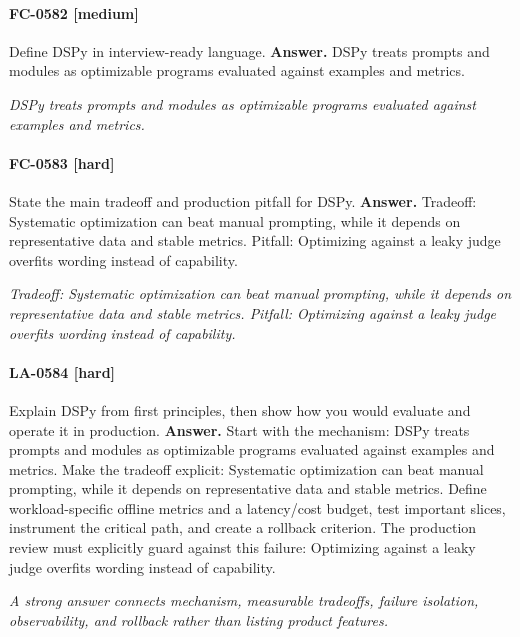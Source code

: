 \paragraph{FC-0582 [medium]} Define DSPy in interview-ready language.
\noindent\textbf{Answer.} DSPy treats prompts and modules as optimizable programs evaluated against examples and metrics.
\par\textit{DSPy treats prompts and modules as optimizable programs evaluated against examples and metrics.}
\paragraph{FC-0583 [hard]} State the main tradeoff and production pitfall for DSPy.
\noindent\textbf{Answer.} Tradeoff: Systematic optimization can beat manual prompting, while it depends on representative data and stable metrics. Pitfall: Optimizing against a leaky judge overfits wording instead of capability.
\par\textit{Tradeoff: Systematic optimization can beat manual prompting, while it depends on representative data and stable metrics. Pitfall: Optimizing against a leaky judge overfits wording instead of capability.}
\paragraph{LA-0584 [hard]} Explain DSPy from first principles, then show how you would evaluate and operate it in production.
\noindent\textbf{Answer.} Start with the mechanism: DSPy treats prompts and modules as optimizable programs evaluated against examples and metrics. Make the tradeoff explicit: Systematic optimization can beat manual prompting, while it depends on representative data and stable metrics. Define workload-specific offline metrics and a latency/cost budget, test important slices, instrument the critical path, and create a rollback criterion. The production review must explicitly guard against this failure: Optimizing against a leaky judge overfits wording instead of capability.
\par\textit{A strong answer connects mechanism, measurable tradeoffs, failure isolation, observability, and rollback rather than listing product features.}
